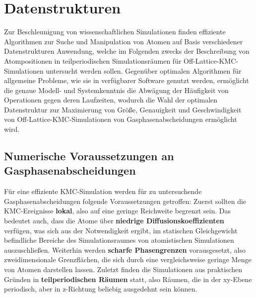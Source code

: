 \section{Datenstrukturen}
\label{datastructures}

Zur Beschleunigung von wissenschaftlichen Simulationen finden effiziente Algorithmen zur Suche und Manipulation von Atomen auf Basis verschiedener Datenstrukturen Anwendung, welche im Folgenden zwecks der Beschreibung von Atompositionen in teilperiodischen Simulationsräumen für Off-Lattice-KMC-Simulationen untersucht werden sollen.
Gegenüber optimalen Algorithmen für allgemeine Probleme, wie sie in verfügbarer Software genutzt werden, ermöglicht die genaue Modell- und Systemkenntnis die Abwägung der Häufigkeit von Operationen gegen deren Laufzeiten,
wodurch die Wahl der optimalen Datenstruktur zur Maximierung von Größe, Genauigkeit und Geschwindigkeit von Off-Lattice-KMC-Simulationen von Gasphasenabscheidungen ermöglicht wird.

\subsection{Numerische Voraussetzungen an Gasphasenabscheidungen}

Für eine effiziente KMC-Simulation werden für zu untersuchende Gasphasenabscheidungen folgende Voraussetzungen getroffen:
Zuerst sollten die KMC-Ereignisse \textbf{lokal}, also auf eine geringe Reichweite begrenzt sein.
Das bedeutet auch, dass die Atome über \textbf{niedrige Diffusionskoeffizienten} verfügen, was sich aus der Notwendigkeit ergibt, im statischen Gleichgewicht befindliche Bereiche des Simulationsraumes von atomistischen Simulationen auszuschließen.
Weiterhin werden \textbf{scharfe Phasengrenzen} vorausgesetzt, also zweidimensionale Grenzflächen, die sich durch eine vergleichsweise geringe Menge von Atomen darstellen lassen.
Zuletzt finden die Simulationen aus praktischen Gründen in \textbf{teilperiodischen Räumen} statt, also Räumen, die in der xy-Ebene periodisch, aber in z-Richtung beliebig ausgedehnt sein können.


